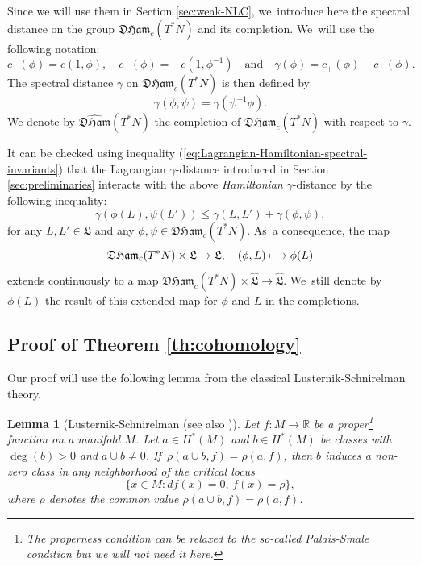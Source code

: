 \documentclass[JEP,XML,SOM,Unicode,NoFloatCountersInSection,published]{cedram}
\newcommand\mto{\mathchoice{\longmapsto}{\mapsto}{\mapsto}{\mapsto}}
\newtheorem{lem}[thm]{Lemma}
\theoremstyle{definition}
\newcommand{\R}{\mathbb{R}}
\newcommand{\DHam}{\mathfrak{DHam}}
\newcommand{\fL}{\mathfrak {L}}
\newcommand{\hatL}{\widehat{\fL}}
\newcommand{\hatDHam}{\widehat{\DHam}}
\begin{document}
Since we will use them in Section \ref{sec:weak-NLC}, we~introduce here the spectral distance on the group $\DHam_c(T^*N)$ and its completion. We~will use the following notation:\vspace*{-3pt}\enlargethispage{\baselineskip}
\[
c_-(\phi)=c(1, \phi),\quad c_+(\phi)=-c(1, \phi^{-1}) \quad\text{and}\quad \gamma(\phi)=c_+(\phi)-c_-(\phi).
\]
The spectral distance $\gamma$ on $\DHam_c(T^*N)$ is then defined by\vspace*{-3pt}
\[
\gamma(\phi, \psi)=\gamma(\psi^{-1}\phi).
\]
We denote by $\hatDHam(T^*N)$ the completion of $\DHam_c(T^*N)$ with respect to $\gamma$.

It can be checked using inequality (\ref{eq:Lagrangian-Hamiltonian-spectral-invariants}) that the Lagrangian $\gamma$\nobreakdash-distance introduced in Section \ref{sec:preliminaries} interacts with the above \emph{Hamiltonian} $\gamma$\nobreakdash-distance by the following \hbox{inequality}:\vspace*{-3pt}
\begin{equation*}\label{eq:ham-lag-gamma}
\gamma(\phi(L), \psi(L'))\leq \gamma(L,L')+\gamma(\phi, \psi),
\end{equation*}
for any $L, L'\in\fL$ and any $\phi, \psi\in\DHam_c(T^*N)$. As~a consequence, the map\vspace*{-3pt}
\[
\DHam_c(T^*N)\times \fL\to\fL,\quad (\phi,L)\mto\phi(L)
\]
extends continuously to a map $\hatDHam_c(T^*N)\times \hatL\to\hatL$. We~still denote by $\phi(L)$ the result of this extended map for $\phi$ and $L$ in the completions.

\subsection{Proof of Theorem \ref{th:cohomology}}\label{sec:proof-cohomology}

Our proof will use the following lemma from the classical Lusternik-Schnirelman theory.

\begin{lem}[Lusternik-Schnirelman \cite{Lusternik-Schnirelman}(see also \cite{Viterbo-Montreal})]\label{lem:Lusternik-Schnirelman} Let $f:M\to\R$ be a proper\footnote{The properness condition can be relaxed to the so-called Palais-Smale condition but we will not need it here.} function on a manifold $M$. Let $a\in H^*(M)$ and $b\in H^*(M)$ be classes with $\deg(b)>0$ and $a\cup b\neq 0$. If~$\rho(a\cup b,f)=\rho(a, f)$, then $b$ induces a non-zero class in any neighborhood of the critical locus\vspace*{-3pt}
\[
\{x\in M: df(x)=0,\, f(x)=\rho\},
\]
where $\rho$ denotes the common value $\rho(a\cup b,f)=\rho(a, f)$.
\end{lem}
\end{document}
